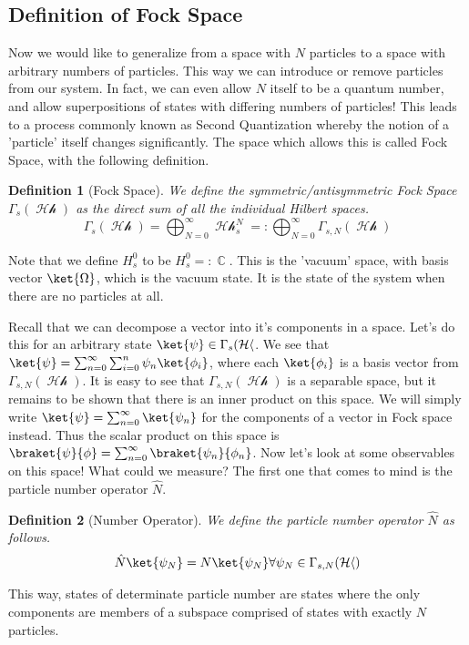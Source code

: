 \documentclass{article}
\DeclareMathOperator{\Hh}{\mathcal{Hh}}
\DeclareMathOperator{\CC}{\mathbb{C}}
\newtheorem{defn}{Definition}
\begin{document}
\subsection{Definition of Fock Space}
Now we would like to generalize from a space with $N$ particles to a space with arbitrary numbers of particles. This way we can introduce or remove particles from our system. In fact, we can even allow $N$ itself to be a quantum number, and allow superpositions of states with differing numbers of particles! This leads to a process commonly known as Second Quantization whereby the notion of a 'particle' itself changes significantly. The space which allows this is called Fock Space, with the following definition.

\begin{defn}[Fock Space] We define the symmetric/antisymmetric Fock Space $\Gamma_s(\Hh)$ as the direct sum of all the individual Hilbert spaces.
\begin{equation}
\Gamma_s(\Hh) = \bigoplus_{N=0}^\infty \Hh_s^N =: \bigoplus_{N=0}^\infty \Gamma_{s,N}(\Hh)
\end{equation}
\end{defn}
Note that we define $H_s^0$ to be $H_s^0=:\CC$. This is the 'vacuum' space, with basis vector $\ket{\Omega}$, which is the vacuum state. It is the state of the system when there are no particles at all.

Recall that we can decompose a vector into it's components in a space. Let's do this for an arbitrary state $\ket{\psi} \in \Gamma_s(\Hh$. We see that $\ket{\psi} = \sum_{n=0}^\infty\sum_{i=0}^n \psi_n \ket{\phi_i}$, where each $\ket{\phi_i}$ is a basis vector from $\Gamma_{s,N}(\Hh)$. It is easy to see that $\Gamma_{s,N}(\Hh)$ is a separable space, but it remains to be shown that there is an inner product on this space. We will simply write $\ket{\psi} = \sum_{n=0}^\infty \ket{\psi_n}$ for the components of a vector in Fock space instead. Thus the scalar product on this space is $\braket{\psi}{\phi}=\sum_{n=0}^\infty \braket{\psi_n}{\phi_n}$. Now let's look at some observables on this space! What could we measure? The first one that comes to mind is the particle number operator $\hat N$.
\begin{defn}[Number Operator]
We define the particle number operator $\hat N$ as follows.
\begin{equation}
\hat N \ket{\psi_N} = N\ket{\psi_N} \forall \psi_N \in \Gamma_{s,N}(\Hh)
\end{equation}
\end{defn}
This way, states of determinate particle number are states where the only components are members of a subspace comprised of states with exactly $N$ particles. 
\end{document}
